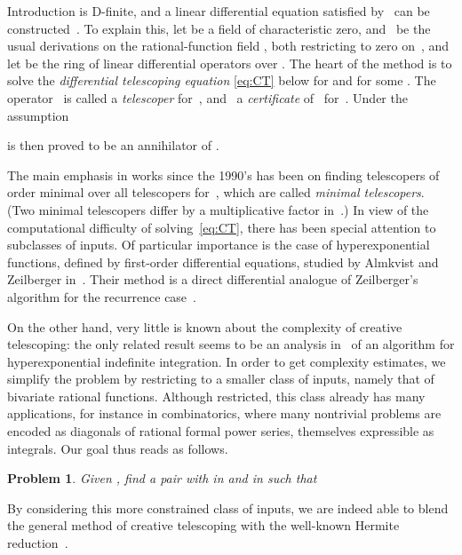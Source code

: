 \documentclass{sig-alt-full}
\newtheorem{problem}{Problem} \renewcommand{\theproblem}{}
\begin{document}
\begin{section}{Introduction}
is D-finite, and a linear differential equation satisfied by~ can
be constructed~\cite{Zeilberger1990}.
To explain this, let  be
a field of characteristic zero,  and~ be the usual
derivations on the rational-function field ,
both restricting to zero on~,
and let  be the ring of linear differential
operators over .
The heart of the method is to solve the
\emph{differential telescoping equation}
\eqref{eq:CT} below
for  and  for
some .
The operator~ is called a
\emph{telescoper\/} for~, and ~a \emph{certificate\/} of~ for~.
Under the assumption

 is then proved to be an annihilator of .

The main emphasis in works since the 1990's has been on finding
telescopers of order minimal over all telescopers for~, which are
called \emph{minimal telescopers}.
(Two minimal telescopers differ by a multiplicative factor in~.)
In view of the computational
difficulty of solving~\eqref{eq:CT}, there has been special
attention to subclasses of inputs. Of particular importance is the
case of hyperexponential functions, defined by first-order
differential equations, studied by Almkvist and Zeilberger
in~\cite{Almkvist1990}. Their method is a direct differential
analogue of Zeilberger's algorithm for the recurrence
case~\cite{Zeilberger1991}.

On the other hand, very little is known about the complexity of
creative telescoping: the only related result seems to be an
analysis in~\cite{Gerhard2004} of an algorithm for hyperexponential
indefinite integration.
In order to get complexity estimates, we simplify the
problem by restricting to a smaller class of inputs, namely that of
bivariate rational functions.
Although restricted, this class already has many applications,
for instance in combinatorics,
where many nontrivial problems are encoded as diagonals of rational
formal power series, themselves expressible as integrals.
Our goal thus reads as follows.

\begin{problem}
Given , find a pair  with
 in  and  in  such that

\end{problem}

By considering this more constrained class of inputs, we are indeed
able to blend the general method of creative telescoping with the
well-known Hermite reduction~\cite{Hermite1872}.


\end{section}
\end{document}
